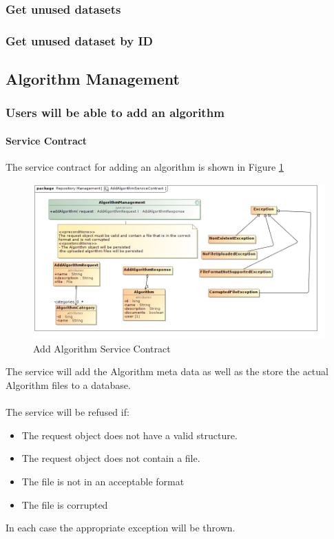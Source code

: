 \subsubsection {Get unused datasets}
\subsubsection {Get unused dataset by ID}

\subsection{Algorithm Management}
\subsubsection {Users will be able to add an algorithm}
\paragraph{Service Contract}
The service contract for adding an algorithm is shown in Figure \ref{fig:addAlgorithmService}

\begin{figure}[H]
  \begin{center}
  \includegraphics[scale=0.5]{../Diagrams and Charts/Test Data/AddAlgorithmServiceContract.jpg}
  \caption{Add Algorithm Service Contract}
  \label{fig:addAlgorithmService}
  \end{center}  
 \end{figure}

 The service will add the Algorithm meta data as well as the store the
 actual Algorithm files to a database.\\\\
 The service will be refused if:\\
	 \begin{itemize}
	 	\item The request object does not have a valid structure.	 	
	 	\item The request object does not contain a file.
	 	\item The file is not in an acceptable format
	 	\item The file is corrupted
	 \end{itemize}
In each case the appropriate exception will be thrown.

